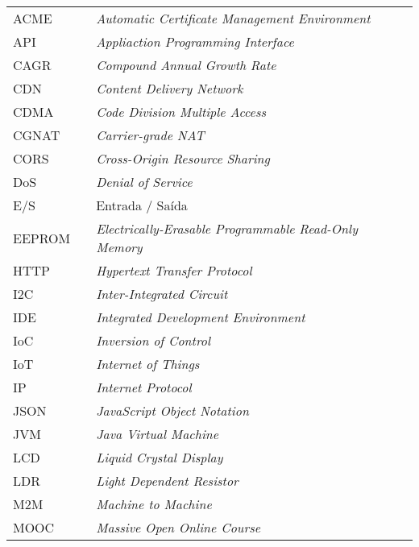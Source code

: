 \begin{table}[H]
\centering
\label{my-label}
\begin{tabular}{lll}
ACME  &  & \textit{Automatic Certificate Management Environment}     \\
API   &  & \textit{Appliaction Programming Interface}                \\
CAGR  &  & \textit{Compound Annual Growth Rate}                      \\
CDN   &  & \textit{Content Delivery Network}                         \\
CDMA  &  & \textit{Code Division Multiple Access}                    \\
CGNAT &  & \textit{Carrier-grade NAT}                                \\
CORS  &  & \textit{Cross-Origin Resource Sharing}                    \\
DoS   &  & \textit{Denial of Service}                                \\
E/S   &  & Entrada / Saída                                           \\
EEPROM & & \textit{Electrically-Erasable Programmable Read-Only Memory} \\
HTTP  &  & \textit{Hypertext Transfer Protocol}                      \\
I2C   &  & \textit{Inter-Integrated Circuit}                         \\
IDE   &  & \textit{Integrated Development Environment}               \\
IoC   &  & \textit{Inversion of Control}                             \\
IoT   &  & \textit{Internet of Things}                               \\
IP    &  & \textit{Internet Protocol}                                \\
JSON  &  & \textit{JavaScript Object Notation}                       \\
JVM   &  & \textit{Java Virtual Machine}                             \\
LCD   &  & \textit{Liquid Crystal Display}                           \\
LDR   &  & \textit{Light Dependent Resistor}                         \\
M2M   &  & \textit{Machine to Machine}                               \\
MOOC  &  & \textit{Massive Open Online Course}                       \\

\end{tabular}
\end{table}
